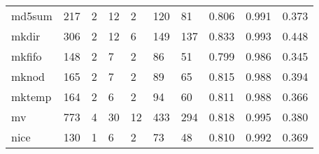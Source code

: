 \begin{longtable}{lp{2.0cm}p{2.0cm}p{2.0cm}p{2.0cm}p{2.0cm}p{2.0cm}p{2.0cm}p{2.0cm}p{2.0cm}}
md5sum    &                    217 &                                  2 &                                12 &                                2 &                               120 &                              81 &                                   0.806 &                                  0.991 &                                0.373 \\
mkdir     &                    306 &                                  2 &                                12 &                                6 &                               149 &                             137 &                                   0.833 &                                  0.993 &                                0.448 \\
mkfifo    &                    148 &                                  2 &                                 7 &                                2 &                                86 &                              51 &                                   0.799 &                                  0.986 &                                0.345 \\
mknod     &                    165 &                                  2 &                                 7 &                                2 &                                89 &                              65 &                                   0.815 &                                  0.988 &                                0.394 \\
mktemp    &                    164 &                                  2 &                                 6 &                                2 &                                94 &                              60 &                                   0.811 &                                  0.988 &                                0.366 \\
mv        &                    773 &                                  4 &                                30 &                               12 &                               433 &                             294 &                                   0.818 &                                  0.995 &                                0.380 \\
nice      &                    130 &                                  1 &                                 6 &                                2 &                                73 &                              48 &                                   0.810 &                                  0.992 &                                0.369 \\

\end{longtable}
